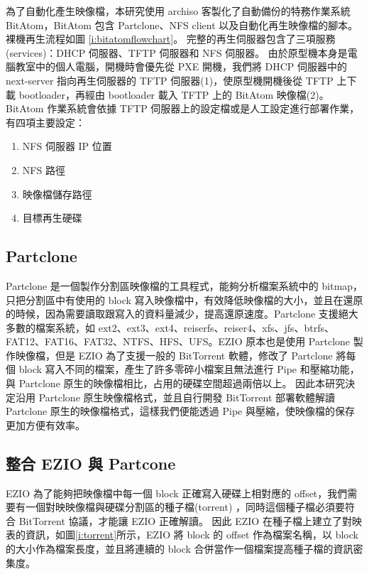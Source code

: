 為了自動化產生映像檔，本研究使用 archiso 客製化了自動備份的特務作業系統 BitAtom，BitAtom 包含 Partclone、NFS client 以及自動化再生映像檔的腳本。
裸機再生流程如圖 \ref{i:bitatomflowchart}。
完整的再生伺服器包含了三項服務(services)：DHCP 伺服器、TFTP 伺服器和 NFS 伺服器。
由於原型機本身是電腦教室中的個人電腦，開機時會優先從 PXE 開機，我們將 DHCP 伺服器中的 next-server 指向再生伺服器的 TFTP 伺服器(1)，使原型機開機後從 TFTP 上下載 bootloader，再經由 bootloader 載入 TFTP 上的 BitAtom 映像檔(2)。BitAtom 作業系統會依據 TFTP 伺服器上的設定檔或是人工設定進行部署作業，有四項主要設定：
\begin{enumerate}
\item NFS 伺服器 IP 位置
\item NFS 路徑
\item 映像檔儲存路徑
\item 目標再生硬碟
\end{enumerate}




\subsection{Partclone}
Partclone 是一個製作分割區映像檔的工具程式，能夠分析檔案系統中的 bitmap，只把分割區中有使用的 block 寫入映像檔中，有效降低映像檔的大小，並且在還原的時候，因為需要讀取跟寫入的資料量減少，提高還原速度。Partclone 支援絕大多數的檔案系統，如 ext2、ext3、ext4、reiserfs、reiser4、xfs、jfs、btrfs、FAT12、FAT16、FAT32、NTFS、HFS、UFS。EZIO 原本也是使用 Partclone 製作映像檔，但是 EZIO 為了支援一般的 BitTorrent 軟體，修改了 Partclone 將每個 block 寫入不同的檔案，產生了許多零碎小檔案且無法進行 Pipe 和壓縮功能，與 Partclone 原生的映像檔相比，占用的硬碟空間超過兩倍以上。
因此本研究決定沿用 Partclone 原生映像檔格式，並且自行開發 BitTorrent 部署軟體解讀 Partclone 原生的映像檔格式，這樣我們便能透過 Pipe 與壓縮，使映像檔的保存更加方便有效率。


\subsection{整合 EZIO 與 Partcone} \label{ezio_and_partclone}

EZIO 為了能夠把映像檔中每一個 block 正確寫入硬碟上相對應的 offset，我們需要有一個對映映像檔與硬碟分割區的種子檔(torrent) ，同時這個種子檔必須要符合 BitTorrent 協議，才能讓 EZIO 正確解讀。
因此 EZIO 在種子檔上建立了對映表的資訊，如圖\ref{i:torrent}所示，EZIO 將 block 的 offset 作為檔案名稱，以 block 的大小作為檔案長度，並且將連續的 block 合併當作一個檔案提高種子檔的資訊密集度。


